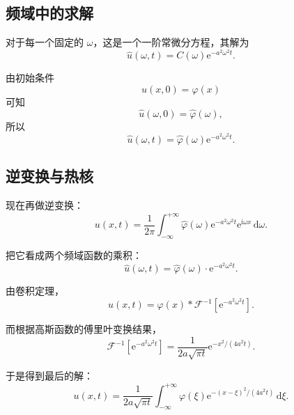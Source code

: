 \subsection{频域中的求解}

对于每一个固定的 $\omega$，这是一个一阶常微分方程，其解为
\begin{equation}
    \hat{u}(\omega,t)=C(\omega)\mathrm{e}^{-a^2\omega^2 t}.
\end{equation}

由初始条件
\begin{equation}
    u(x,0)=\varphi(x)
\end{equation}
可知
\begin{equation}
    \hat{u}(\omega,0)=\hat{\varphi}(\omega),
\end{equation}
所以
\begin{equation}
    \hat{u}(\omega,t)=\hat{\varphi}(\omega)\mathrm{e}^{-a^2\omega^2 t}.
\end{equation}

\subsection{逆变换与热核}

现在再做逆变换：
\begin{equation}
    u(x,t)=\frac{1}{2\pi}\int_{-\infty}^{+\infty}
    \hat{\varphi}(\omega)\mathrm{e}^{-a^2\omega^2 t}\mathrm{e}^{\mathrm{i}\omega x}\,\mathrm{d}\omega.
\end{equation}

把它看成两个频域函数的乘积：
\begin{equation}
    \hat{u}(\omega,t)=\hat{\varphi}(\omega)\cdot \mathrm{e}^{-a^2\omega^2 t}.
\end{equation}

由卷积定理，
\begin{equation}
    u(x,t)=\varphi(x)*\mathcal{F}^{-1}\!\left[\mathrm{e}^{-a^2\omega^2 t}\right].
\end{equation}

而根据高斯函数的傅里叶变换结果，
\begin{equation}
    \mathcal{F}^{-1}\!\left[\mathrm{e}^{-a^2\omega^2 t}\right]
    =
    \frac{1}{2a\sqrt{\pi t}}
    \mathrm{e}^{-x^2/(4a^2 t)}.
\end{equation}

于是得到最后的解：
\begin{equation}
    \boxed{
        u(x,t)
        =
        \frac{1}{2a\sqrt{\pi t}}
        \int_{-\infty}^{+\infty}
        \varphi(\xi)\mathrm{e}^{-(x-\xi)^2/(4a^2t)}\,\mathrm{d}\xi
    }.
\end{equation}

